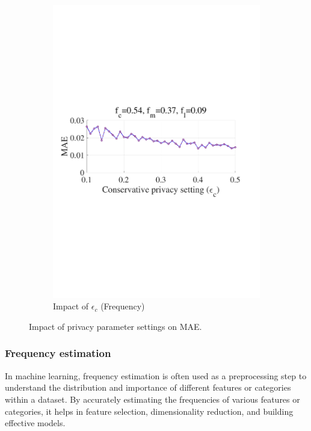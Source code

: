 \documentclass[letterpaper]{article} %
\begin{document}
\begin{figure}[htbp]
\begin{subfigure}[b]{0.23\textwidth}
    \includegraphics[width=\textwidth]{picture/MAEvsEpsilon_c_freq.pdf}
    \caption{Impact of $\epsilon_c$ (Frequency)}
    \label{fig:sub4}
  \end{subfigure}
  \caption{Impact of privacy parameter settings on MAE.}
  \label{fig:full}
\end{figure}
\subsubsection{Frequency estimation}
In machine learning, frequency estimation is often used as a preprocessing step to understand the distribution and importance of different features or categories within a dataset. By accurately estimating the frequencies of various features or categories, it helps in feature selection, dimensionality reduction, and building effective models.
\end{document}
